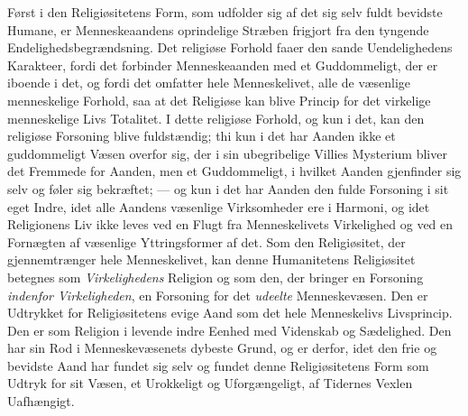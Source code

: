 \documentclass[12pt,a4paper,openany]{book}
\newcommand{\opage}[1]{\marginnote{\footnotesize\textit{[#1]}}}
\begin{document}
Først i den Religiøsitetens Form, som udfolder sig af det
sig selv fuldt bevidste Humane, er Menneskeaandens oprindelige
Stræben frigjort fra den tyngende Endelighedsbegrændsning.
Det religiøse Forhold faaer den sande Uendelighedens Karakteer,
fordi det forbinder Menneskeaanden med et Guddommeligt, der
er iboende i det, og fordi det omfatter hele Menneskelivet, alle
de væsenlige menneskelige Forhold, saa at det Religiøse kan
blive Princip for det virkelige menneskelige Livs Totalitet.
\opage{509}I dette religiøse Forhold, og kun i det, kan den religiøse
Forsoning blive fuldstændig; thi kun i det har Aanden ikke
et guddommeligt Væsen overfor sig, der i sin ubegribelige
Villies Mysterium bliver det Fremmede for Aanden, men et
Guddommeligt, i hvilket Aanden gjenfinder sig selv og føler sig
bekræftet; — og kun i det har Aanden den fulde Forsoning
i sit eget Indre, idet alle Aandens væsenlige Virksomheder
ere i Harmoni, og idet Religionens Liv ikke leves ved en
Flugt fra Menneskelivets Virkelighed og ved en Fornægten
af væsenlige Yttringsformer af det. Som den Religiøsitet, der
gjennemtrænger hele Menneskelivet, kan denne Humanitetens
Religiøsitet betegnes som \emph{Virkelighedens} Religion og
som den, der bringer en Forsoning \emph{indenfor Virkeligheden},
en Forsoning for det \emph{udeelte} Menneskevæsen. Den
er Udtrykket for Religiøsitetens evige Aand som det hele
Menneskelivs Livsprincip. Den er som Religion i levende
indre Eenhed med Videnskab og Sædelighed. Den har sin
Rod i Menneskevæsenets dybeste Grund, og er derfor, idet
den frie og bevidste Aand har fundet sig selv og fundet
denne Religiøsitetens Form som Udtryk for sit Væsen, et
Urokkeligt og Uforgængeligt, af Tidernes Vexlen Uafhængigt.
\end{document}
